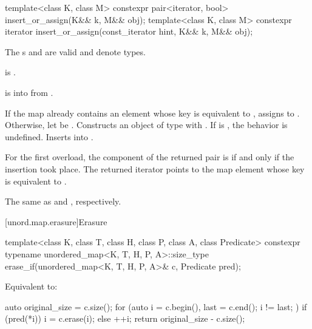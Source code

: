 %
\begin{itemdecl}
template<class K, class M>
  constexpr pair<iterator, bool> insert_or_assign(K&& k, M&& obj);
template<class K, class M>
  constexpr iterator insert_or_assign(const_iterator hint, K&& k, M&& obj);
\end{itemdecl}

\begin{itemdescr}
\pnum
\constraints
The s  and
 are valid and denote types.

\pnum
\mandates
{} is .

\pnum
\expects
{} is 
into 
from .

\pnum
\effects
If the map already contains an element 
whose key is equivalent to ,
assigns  to .
Otherwise, let  be .
Constructs an object  of type 
with .
If  is ,
the behavior is undefined.
Inserts  into .

\pnum
\returns
For the first overload,
the  component of the returned pair is 
if and only if the insertion took place.
The returned iterator points to the map element
whose key is equivalent to .

\pnum
\complexity
The same as  and , respectively.
\end{itemdescr}

[unord.map.erasure]{Erasure}

%
\begin{itemdecl}
template<class K, class T, class H, class P, class A, class Predicate>
  constexpr typename unordered_map<K, T, H, P, A>::size_type
    erase_if(unordered_map<K, T, H, P, A>& c, Predicate pred);
\end{itemdecl}

\begin{itemdescr}
\pnum
\effects
Equivalent to:
\begin{codeblock}
auto original_size = c.size();
for (auto i = c.begin(), last = c.end(); i != last; ) {
  if (pred(*i)) {
    i = c.erase(i);
  } else {
    ++i;
  }
}
return original_size - c.size();
\end{codeblock}
\end{itemdescr}

